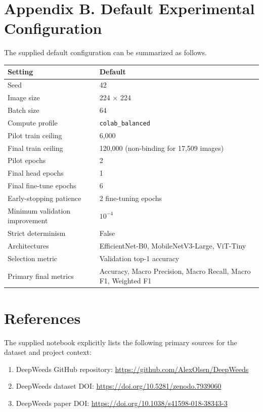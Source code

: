 \documentclass[11pt,a4paper]{article}
\begin{document}
\section*{Appendix B. Default Experimental Configuration}
The supplied default configuration can be summarized as follows.

\begin{center}
{\small\setlength{\tabcolsep}{3pt}\begin{tabularx}{0.96\textwidth}{>{\raggedright\arraybackslash}p{}X}
\toprule
Setting & Default \\
\midrule
Seed & 42 \\
Image size & 224 $\times$ 224 \\
Batch size & 64 \\
Compute profile & \texttt{colab\_balanced} \\
Pilot train ceiling & 6,000 \\
Final train ceiling & 120,000 (non-binding for 17,509 images) \\
Pilot epochs & 2 \\
Final head epochs & 1 \\
Final fine-tune epochs & 6 \\
Early-stopping patience & 2 fine-tuning epochs \\
Minimum validation improvement & $10^{-4}$ \\
Strict determinism & False \\
Architectures & EfficientNet-B0, MobileNetV3-Large, ViT-Tiny \\
Selection metric & Validation top-1 accuracy \\
Primary final metrics & Accuracy, Macro Precision, Macro Recall, Macro F1, Weighted F1 \\
\bottomrule
\end{tabularx}}
\end{center}

\section*{References}
The supplied notebook explicitly lists the following primary sources for the dataset and project context:

\begin{enumerate}
\item DeepWeeds GitHub repository: \url{https://github.com/AlexOlsen/DeepWeeds}
\item DeepWeeds dataset DOI: \url{https://doi.org/10.5281/zenodo.7939060}
\item DeepWeeds paper DOI: \url{https://doi.org/10.1038/s41598-018-38343-3}
\end{enumerate}
\end{document}
